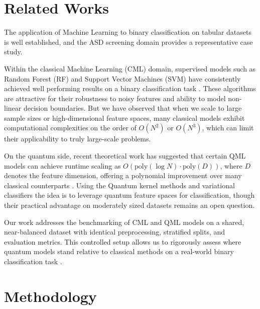 \documentclass[runningheads]{llncs}
\begin{document}
\section{Related Works}\label{sec2}
The application of Machine Learning to binary classification on tabular datasets is well established, and the ASD screening domain provides a representative case study.

Within the classical Machine Learning (CML) domain, supervised models such as Random Forest (RF) and Support Vector Machines (SVM) have consistently achieved well performing results on a binary classification task \cite{vakadkar2021}. These algorithms are attractive for their robustness to noisy features and ability to model non-linear decision boundaries. But we have observed that when we scale to large sample sizes or high-dimensional feature spaces, many classical models exhibit computational complexities on the order of $O(N^2)$ or $O(N^3)$, which can limit their applicability to truly large-scale problems.

On the quantum side, recent theoretical work has suggested that certain QML models can achieve runtime scaling as $O(\text{poly}(\log N) \cdot \text{poly}(D))$, where $D$ denotes the feature dimension, offering a polynomial improvement over many classical counterparts \cite{saranya2025}. Using the  Quantum kernel methods \cite{havlivcek2019} and variational classifiers \cite{schuld2020} the idea is to leverage quantum feature spaces for classification, though their practical advantage on moderately sized datasets remains an open question.

Our work addresses the benchmarking of CML and QML models on a shared, near-balanced dataset with identical preprocessing, stratified splits, and evaluation metrics. This controlled setup allows us to rigorously assess where quantum models stand relative to classical methods on a real-world binary classification task \cite{vakadkar2021,saranya2025,lee2020,nogay2020}.

\section{Methodology}\label{sec3}
\end{document}
